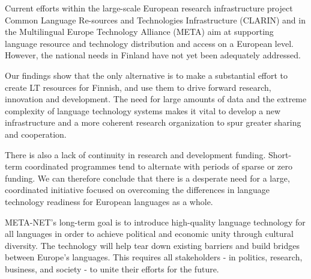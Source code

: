 \documentclass{../../metanetpaper}
\begin{document}
\begin{Parallel}[c]{79mm}{78mm}
{Current efforts within the large-scale European research
infrastructure project Common Language Re-sources and Technologies
Infrastructure (CLARIN) and in the Multilingual Europe Technology
Alliance (META) aim at supporting language resource and technology
distribution and access on a European level. However, the national
needs in Finland have not yet been adequately addressed.

Our findings show that the only alternative is to make a substantial
effort to create LT resources for Finnish, and use them to drive
forward research, innovation and development. The need for large
amounts of data and the extreme complexity of language technology
systems makes it vital to develop a new infrastructure and a more
coherent research organization to spur greater sharing and
cooperation.

There is also a lack of continuity in research and development
funding.  Short-term coordinated programmes tend to alternate with
periods of sparse or zero funding. We can therefore conclude that
there is a desperate need for a large, coordinated initiative focused
on overcoming the differences in language technology readiness for
European languages as a whole.

META-NET’s long-term goal is to introduce high-quality language
technology for all languages in order to achieve political and
economic unity through cultural diversity. The technology will help
tear down existing barriers and build bridges between Europe’s
languages. This requires all stakeholders - in politics, research,
business, and society - to unite their efforts for the future.
}

\ParallelPar


\end{Parallel}
\end{document}

